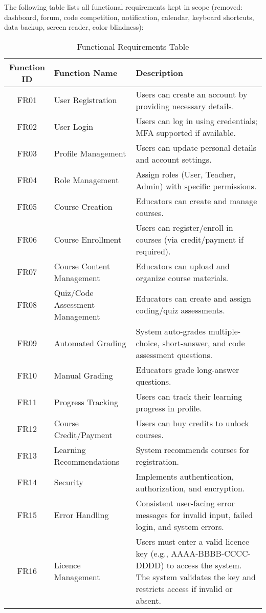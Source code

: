 \documentclass[a4paper, 11pt]{scrreprt}
\begin{document}
The following table lists all functional requirements kept in scope (removed: dashboard, forum, code competition, notification, calendar, keyboard shortcuts, data backup, screen reader, color blindness):

\begin{table}[h!]
    \centering
    \begin{tabular}{|c|l|p{10cm}|}
    \hline
    \textbf{Function ID} & \textbf{Function Name} & \textbf{Description} \\
    \hline
    FR01 & User Registration & Users can create an account by providing necessary details. \\
    FR02 & User Login & Users can log in using credentials; MFA supported if available. \\
    FR03 & Profile Management & Users can update personal details and account settings. \\
    FR04 & Role Management & Assign roles (User, Teacher, Admin) with specific permissions. \\
    FR05 & Course Creation & Educators can create and manage courses. \\
    FR06 & Course Enrollment & Users can register/enroll in courses (via credit/payment if required). \\
    FR07 & Course Content Management & Educators can upload and organize course materials. \\
    FR08 & Quiz/Code Assessment Management & Educators can create and assign coding/quiz assessments. \\
    FR09 & Automated Grading & System auto-grades multiple-choice, short-answer, and code assessment questions. \\
    FR10 & Manual Grading & Educators grade long-answer questions. \\
    FR11 & Progress Tracking & Users can track their learning progress in profile. \\
    FR12 & Course Credit/Payment & Users can buy credits to unlock courses. \\
    FR13 & Learning Recommendations & System recommends courses for registration. \\
    FR14 & Security & Implements authentication, authorization, and encryption. \\
    FR15 & Error Handling & Consistent user-facing error messages for invalid input, failed login, and system errors. \\
    FR16 & Licence Management & Users must enter a valid licence key (e.g., AAAA-BBBB-CCCC-DDDD) to access the system. The system validates the key and restricts access if invalid or absent. \\
    \hline
    \end{tabular}
    \caption{Functional Requirements Table}
\end{table}
\end{document}
